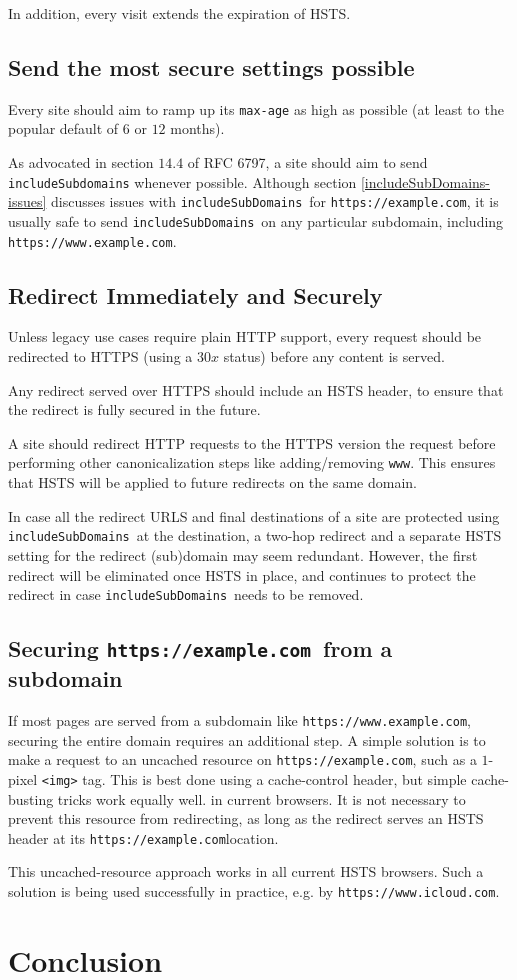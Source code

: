 \documentclass[conference]{./IEEEtran}
\newcommand{\site}[1]{\texttt{#1}}
\newcommand{\code}[1]{\texttt{#1}}
\newcommand{\iSD}{{\code{includeSubDomains}}}
\newcommand{\genericsite}{example.com}
\newcommand{\s}{{\site{https://\genericsite}}}
\newcommand{\sw}{{\site{https://www.\genericsite}}}
\theoremstyle{plain}
\begin{document}
In addition, every visit extends the expiration of HSTS.

\subsection{Send the most secure settings possible}

Every site should aim to ramp up its \code{max-age} as high as possible (at least to the popular default of $6$ or $12$ months).

As advocated in section $14.4$ of RFC 6797\cite{rfc}, a site should aim to send \code{includeSubdomains} whenever possible. Although section \ref{includeSubDomains-issues} discusses issues with \iSD~for \s, it is usually safe to send \iSD~on any particular subdomain, including \sw.

\subsection{Redirect Immediately and Securely}

Unless legacy use cases require plain HTTP support, every request should be redirected to HTTPS (using a $30x$ status) before any content is served.

Any redirect served over HTTPS should include an HSTS header, to ensure that the redirect is fully secured in the future.

A site should redirect HTTP requests to the HTTPS version the request before performing other canonicalization steps like adding/removing \code{www}. This ensures that HSTS will be applied to future redirects on the same domain.

In case all the redirect URLS and final destinations of a site are protected using \iSD~at the destination, a two-hop redirect and a separate HSTS setting for the redirect (sub)domain may seem redundant. However, the first redirect will be eliminated once HSTS in place, and continues to protect the redirect in case \iSD~needs to be removed.

\subsection{Securing \s~from a subdomain}

If most pages are served from a subdomain like \sw, securing the entire domain requires an additional step. A simple solution is to make a request to an uncached resource on \s, such as a $1$-pixel \code{<img>} tag. This is best done using a cache-control header, but simple cache-busting tricks work equally well. in current browsers. It is not necessary to prevent this resource from redirecting, as long as the redirect serves an HSTS header at its \s location.

This uncached-resource approach works in all current HSTS browsers. Such a solution is being used successfully in practice, e.g. by \site{https://www.icloud.com}.

\section{Conclusion}



\end{document}
